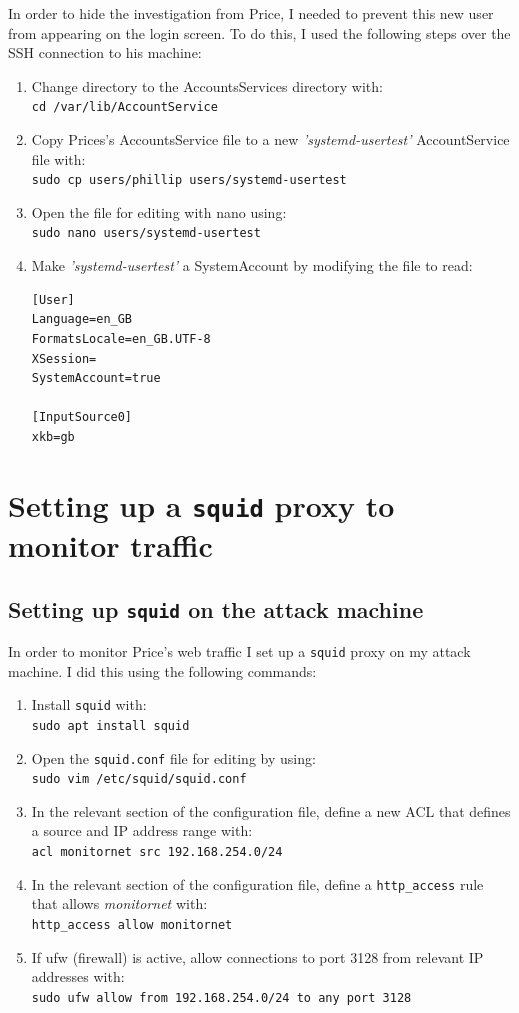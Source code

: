 \documentclass[12pt]{report}
\newcommand{\term}[1]{\colorbox{light-gray}{\texttt{#1}}}
\begin{document}
In order to hide the investigation from Price, I needed to prevent this new user from appearing on the login screen. To do this, I used the following steps over the SSH connection to his machine:
\begin{enumerate}
  \item Change directory to the AccountsServices directory with:\\
        \term{cd /var/lib/AccountService}
  \item Copy Prices's AccountsService file to a new \textit{'systemd-usertest'} AccountService file with:\\
        \term{sudo cp users/phillip users/systemd-usertest}
  \item Open the file for editing with nano using:\\
        \term{sudo nano users/systemd-usertest}
  \item Make \textit{'systemd-usertest'} a SystemAccount by modifying the file to read:
        \begin{Verbatim}[frame=leftline]
[User]
Language=en_GB
FormatsLocale=en_GB.UTF-8
XSession=
SystemAccount=true

[InputSource0]
xkb=gb
        \end{Verbatim}
\end{enumerate}


\section{Setting up a \texttt{squid} proxy to monitor traffic}
\subsection*{Setting up \texttt{squid} on the attack machine}
In order to monitor Price's web traffic I set up a \texttt{squid} proxy on my attack machine. I did this using the following commands:
\begin{enumerate}
  \item Install \texttt{squid} with:\\
        \term{sudo apt install squid}
  \item Open the \texttt{squid.conf} file for editing by using:\\
        \term{sudo vim /etc/squid/squid.conf}
  \item In the relevant section of the configuration file, define a new ACL that defines a source and IP address range with:\\
        \term{acl monitornet src 192.168.254.0/24}
  \item In the relevant section of the configuration file, define a \texttt{http\_access} rule that allows \textit{monitornet} with:\\
        \term{http\_access allow monitornet}
  \item If ufw (firewall) is active, allow connections to port 3128 from relevant IP addresses with:\\
        \term{sudo ufw allow from 192.168.254.0/24 to any port 3128}
\end{enumerate}
\end{document}
